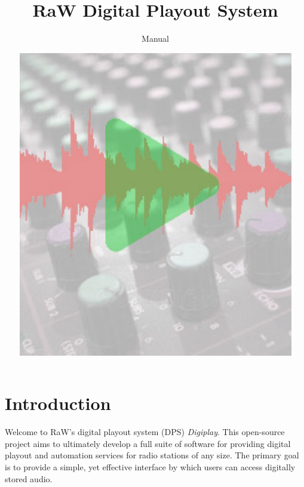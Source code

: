 \documentclass[a4paper,12pt]{report}
\numberwithin{equation}{section}
\begin{document}
\title{RaW Digital Playout System}
\author{Manual}
\date{\includegraphics{digiplay.pdf}}
\maketitle

\clearpage

\chapter{Introduction}
Welcome to RaW's digital playout system (DPS) \emph{Digiplay}. This open-source project aims to ultimately develop a full suite of software for providing digital playout and automation services for radio stations of any size. The primary goal is to provide a simple, yet effective interface by which users can access digitally stored audio.
\end{document}
